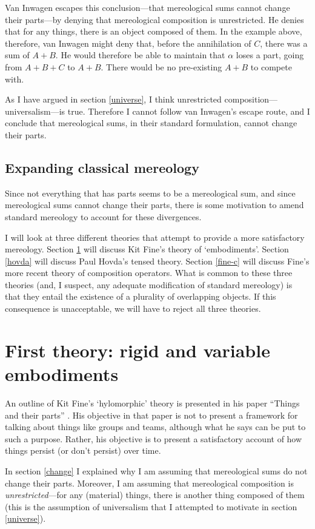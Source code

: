 \documentclass[11pt]{article}
\begin{document}
\begin{spacing}{1.5}
Van Inwagen escapes this conclusion---that mereological sums cannot
change their parts---by denying that mereological composition is
unrestricted.  He denies that for any things, there is an object
composed of them.  In the example above, therefore, van Inwagen might
deny that, before the annihilation of $C$, there was a sum of $A +
B$.  He would therefore be able to maintain that $\alpha$ loses a
part, going from $A + B + C$ to $A + B$.  There would be no
pre-existing $A + B$ to compete with.

As I have argued in section \ref{universe}, I think unrestricted
composition---universalism---is true.  Therefore I cannot follow van
Inwagen's escape route, and I conclude that mereological sums, in
their standard formulation, cannot change their parts.

\subsection{Expanding classical mereology}
\label{expand}
Since not everything that has parts seems to be a mereological sum,
and since mereological sums cannot change their parts, there is some
motivation to amend standard mereology to account for these
divergences.

I will look at three different theories that attempt to provide a more
satisfactory mereology.  Section \ref{fine-h} will discuss Kit Fine's
theory of `embodiments'.  Section \ref{hovda} will discuss Paul
Hovda's tensed theory.  Section \ref{fine-c} will discuss Fine's more
recent theory of composition operators.  What is common to these three
theories (and, I suspect, any adequate modification of standard
mereology) is that they entail the existence of a plurality of
overlapping objects.  If this consequence is unacceptable, we will
have to reject all three theories.

\section{First theory: rigid and variable embodiments}
\label{fine-h}
An outline of Kit Fine's `hylomorphic' theory is presented in his
paper ``Things and their parts'' \citeyearpar{fine1999}.  His
objective in that paper is not to present a framework for talking
about things like groups and teams, although what he says can be put
to such a purpose.  Rather, his objective is to present a satisfactory
account of how things persist (or don't persist) over time.

In section \ref{change} I explained why I am assuming that
mereological sums do not change their parts.  Moreover, I am assuming
that mereological composition is {\em unrestricted}---for any
(material) things, there is another thing composed of them (this is
the assumption of universalism that I attempted to motivate in section
\ref{universe}).


\end{spacing}
\end{document}

